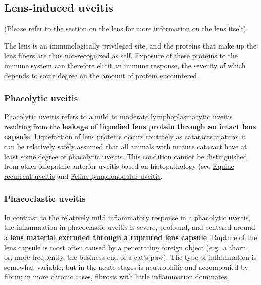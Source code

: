 \documentclass[
  openany]{article}
\begin{document}
\hypertarget{lens-induced-uveitis}{%
\subsection{Lens-induced uveitis}\label{lens-induced-uveitis}}

(Please refer to the section on the \protect\hyperlink{pathology-of-the-lens}{lens} for more information on the lens itself).

The lens is an immunologically privileged site, and the proteins that make up the lens fibers are thus not-recognized as self. Exposure of these proteins to the immune system can therefore elicit an immune response, the severity of which depends to some degree on the amount of protein encountered.

\hypertarget{phacolytic-uveitis}{%
\subsubsection{Phacolytic uveitis}\label{phacolytic-uveitis}}

Phacolytic uveitis refers to a mild to moderate lymphoplasmacytic uveitis resulting from the \textbf{leakage of liquefied lens protein through an intact lens capsule}. Liquefaction of lens proteins occurs routinely as cataracts mature; it can be relatively safely assumed that all animals with mature cataract have at least some degree of phacolytic uveitis. This condition cannot be distinguished from other idiopathic anterior uveitis based on histopathology (see \protect\hyperlink{equine-recurrent-uveitis}{Equine recurrent uveitis} and \protect\hyperlink{feline-lymphonodular-uveitis}{Feline lymphonodular uveitis}.

\hypertarget{phacoclastic-uveitis}{%
\subsubsection{Phacoclastic uveitis}\label{phacoclastic-uveitis}}

In contrast to the relatively mild inflammatory response in a phacolytic uveitis, the inflammation in phacoclastic uveitis is severe, profound, and centered around a \textbf{lens material extruded through a ruptured lens capsule}. Rupture of the lens capsule is most often caused by a penetrating foreign object (e.g.~a thorn, or, more frequently, the business end of a cat's paw). The type of inflammation is somewhat variable, but in the acute stages is neutrophilic and accompanied by fibrin; in more chronic cases, fibrosis with little inflammation dominates.
\end{document}
